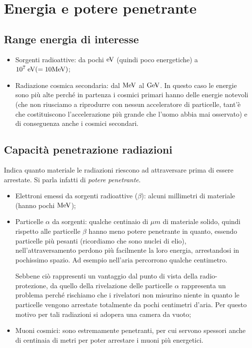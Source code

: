 \section{Energia e potere penetrante}

\subsection{Range energia di interesse}

\begin{itemize}
    \item Sorgenti radioattive: da pochi $\rm eV$ (quindi poco energetiche) a $\rm 10^7 \; eV(=10MeV)$;
    \item Radiazione cosmica secondaria: dal $\rm MeV$ al $\rm GeV$. In questo caso le energie sono più alte perché in partenza i cosmici primari hanno delle energie notevoli (che non riusciamo a riprodurre con nessun acceleratore di particelle, tant'è che costituiscono l'accelerazione più grande che l'uomo abbia mai osservato) e di conseguenza anche i cosmici secondari.
\end{itemize}

\subsection{Capacità penetrazione radiazioni}

Indica quanto materiale le radiazioni riescono ad attraversare prima di essere arrestate. Si parla infatti di \textit{potere penetrante}.

\begin{itemize}
    \item Elettroni emessi da sorgenti radioattive ($\beta$): alcuni millimetri di materiale (hanno pochi $\rm MeV$);
    \item Particelle $\alpha$ da sorgenti: qualche centinaio di $\mu m$ di materiale solido, quindi rispetto alle particelle $\beta$ hanno meno potere penetrante in quanto, essendo particelle più pesanti (ricordiamo che sono nuclei di elio), nell'attraversamento perdono più facilmente la loro energia, arrestandosi in pochissimo spazio. Ad esempio nell'aria percorrono qualche centimetro.
    
    Sebbene ciò rappresenti un vantaggio dal punto di vista della radio-protezione, da quello della rivelazione delle particelle $\alpha$ rappresenta un problema perché rischiamo che i rivelatori non misurino niente in quanto le particelle vengono arrestate totalmente da pochi centimetri d'aria. Per questo motivo per tali radiazioni si adopera una camera da vuoto;
    \item Muoni cosmici: sono estremamente penetranti, per cui servono spessori anche di centinaia di metri per poter arrestare i muoni più energetici.
\end{itemize}

